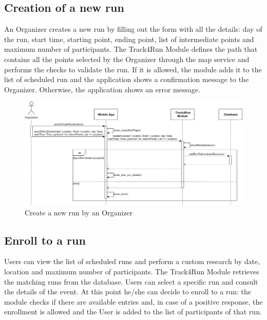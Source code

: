\subsection{Creation of a new run}
An Organizer creates a new run by filling out the form with all the details: day of the run, start time, starting point, ending point, list of intermediate points and maximum number of participants. The Track4Run Module defines the path that contains all the points selected by the Organizer through the map service and performs the checks to validate the run. If it is allowed, the module adds it to the list of scheduled run and the application shows a confirmation message to the Organizer. Otherwise, the application shows an error message.

\begin{figure}[H]

    \centering
    \includegraphics[scale=0.14]{./Pictures/createRunSeqDiagDD.png}
    \caption{Create a new run by an Organizer}
    
\end{figure}

\subsection{Enroll to a run}
Users can view the list of scheduled runs and perform a custom research by date, location and maximum number of participants. The Track4Run Module retrieves the matching runs from the database. Users can select a specific run and consult the details of the event. At this point he/she can decide to enroll to a run: the module checks if there are available entries and, in case of a positive response, the enrollment is allowed and the User is added to the list of participants of that run.

